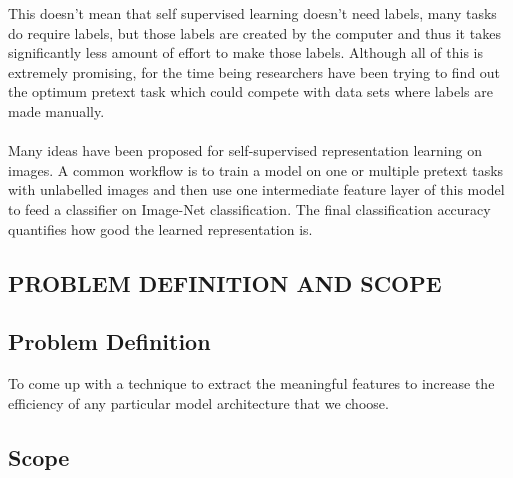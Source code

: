 \documentclass[a4paper, 12pt]{article}
\begin{document}
  

\hspace{1cm} 

This doesn't mean that self supervised learning doesn't need labels, many tasks do require labels, but those labels are created by the computer and thus it takes significantly less amount of effort to make those labels. Although all of this is extremely promising, for the time being researchers have been trying to find out the optimum pretext task which could compete with data sets where labels are made manually.
\\



\hspace{1cm}\\
Many ideas have been proposed for self-supervised representation learning on images. A common workflow is to train a model on one or multiple pretext tasks with unlabelled images and then use one intermediate feature layer of this model to feed a classifier on Image-Net classification. The final classification accuracy quantifies how good the learned representation is.
\newpage
\begin{center}
\section{PROBLEM DEFINITION AND SCOPE}
\end{center}

\subsection{Problem Definition}

\hspace{1.5cm} To come up with a technique to extract the meaningful features to increase the efficiency of any particular model architecture that we choose.

\subsection{Scope}
\end{document}
